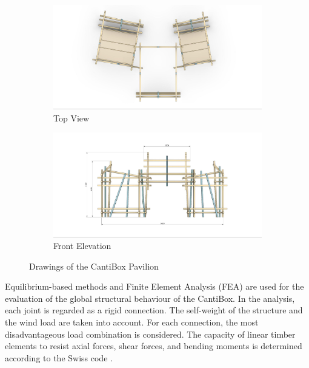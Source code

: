 \begin{figure}[!h]
    \centering
    \begin{subfigure}[b]{0.49\textwidth}
        \centering
        \includegraphics[width=\textwidth]{images/08/img23.jpg}
        \caption{Top View}
    \end{subfigure}
    \hfill
    \begin{subfigure}[b]{0.49\textwidth}
        \centering
        \includegraphics[width=\textwidth]{images/08/img24.jpg}
        \caption{Front Elevation}
    \end{subfigure}
    \caption{Drawings of the CantiBox Pavilion}
    \label{fig:drawing-canitibox-pavilion}
\end{figure}

Equilibrium-based methods and Finite Element Analysis (FEA) are used for the evaluation of the global structural behaviour of the CantiBox. In the analysis, each joint is regarded as a rigid connection. The self-weight of the structure and the wind load are taken into account. For each connection, the most disadvantageous load combination is considered. The capacity of linear timber elements to resist axial forces, shear forces, and bending moments is determined according to the Swiss code \parencite{swissstandardsassociationSIA265Timber2003}.

